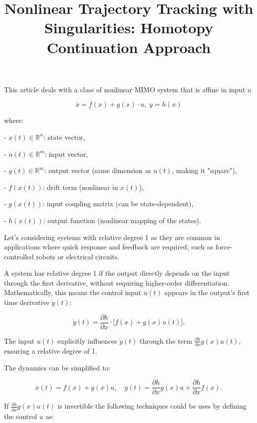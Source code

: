 \documentclass[11pt,american]{article}
\title{Nonlinear Trajectory Tracking with Singularities: Homotopy Continuation Approach}
\begin{document}
\maketitle

This article deals with a class of nonlinear MIMO system that is affine in input $u$

\begin{equation}
\dot x = f(x) + g(x) \cdot u, \; y = h(x)
\end{equation}

where:

- \( x(t) \in \mathbb{R}^n \): state vector,

- \( u(t) \in \mathbb{R}^m \): input vector,

- \( y(t) \in \mathbb{R}^m \): output vector (same dimension as \( u(t) \), making it "square"),

- \( f(x(t)) \): drift term (nonlinear in \( x(t) \)),

- \( g(x(t)) \): input coupling matrix (can be state-dependent),

- \( h(x(t)) \): output function (nonlinear mapping of the states).

Let's considering systems with relative degree 1 as they are common in applications where quick response and feedback are required, such as force-controlled robots or electrical circuits.

A system has relative degree 1 if the output directly depends on the input through the first derivative, without requiring higher-order differentiation. Mathematically, this means the control input \( u(t) \) appears in the output's first time derivative \( \dot{y}(t) \):

\begin{equation}
\dot{y}(t) = \frac{\partial h}{\partial x} \cdot \big[f(x) + g(x)u(t)\big].
\end{equation}
 
The input \( u(t) \) explicitly influences \( \dot{y}(t) \) through the term \( \frac{\partial h}{\partial x} g(x)u(t) \), ensuring a relative degree of 1.

The dynamics can be simplified to:

\begin{equation}
\dot{x}(t) = f(x) + g(x)u, \quad \dot{y}(t) = \frac{\partial h}{\partial x}g(x)u + \frac{\partial h}{\partial x}f(x).
\end{equation}

If \( \frac{\partial h}{\partial x} g(x)u(t) \) is invertible the following techniques could be uses by defining the control \( u \) as:
\end{document}
